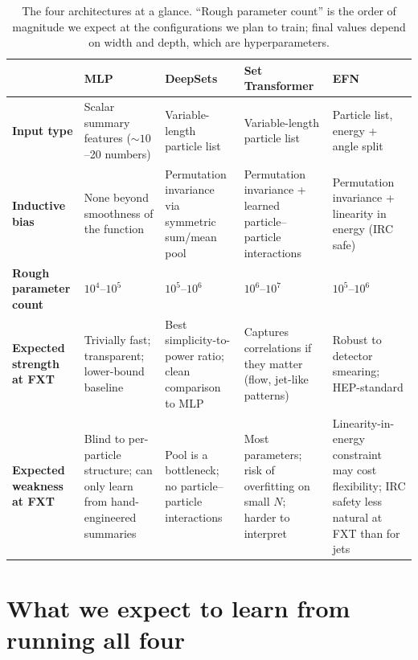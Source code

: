 \documentclass[11pt]{article}
\begin{document}
\begin{table}[h]
\centering
\renewcommand{\arraystretch}{1.35}
\begin{tabularx}{\textwidth}{l|X|X|X|X}
\toprule
              & \textbf{MLP}
              & \textbf{DeepSets}
              & \textbf{Set Transformer}
              & \textbf{EFN} \\
\midrule
\textbf{Input type}
              & Scalar summary features ($\sim 10$--20 numbers)
              & Variable-length particle list
              & Variable-length particle list
              & Particle list, energy + angle split \\
\midrule
\textbf{Inductive bias}
              & None beyond smoothness of the function
              & Permutation invariance via symmetric sum/mean pool
              & Permutation invariance + learned particle--particle interactions
              & Permutation invariance + linearity in energy (IRC safe) \\
\midrule
\textbf{Rough parameter count}
              & $10^4$--$10^5$
              & $10^5$--$10^6$
              & $10^6$--$10^7$
              & $10^5$--$10^6$ \\
\midrule
\textbf{Expected strength at FXT}
              & Trivially fast; transparent; lower-bound baseline
              & Best simplicity-to-power ratio; clean comparison to MLP
              & Captures correlations if they matter (flow, jet-like patterns)
              & Robust to detector smearing; HEP-standard \\
\midrule
\textbf{Expected weakness at FXT}
              & Blind to per-particle structure; can only learn from hand-engineered summaries
              & Pool is a bottleneck; no particle--particle interactions
              & Most parameters; risk of overfitting on small $N$; harder to interpret
              & Linearity-in-energy constraint may cost flexibility; IRC safety less natural at FXT than for jets \\
\bottomrule
\end{tabularx}
\caption{The four architectures at a glance. ``Rough parameter
count'' is the order of magnitude we expect at the configurations we
plan to train; final values depend on width and depth, which are
hyperparameters.}
\end{table}

\section{What we expect to learn from running all four}
\end{document}
